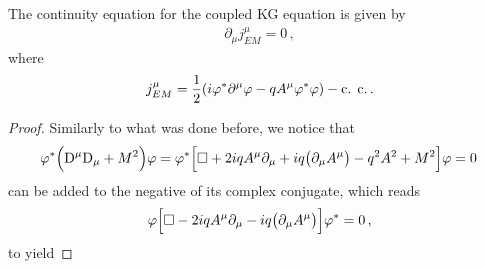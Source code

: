 \documentclass[main.tex]{subfiles}
\begin{document}
\begin{claim}
The continuity equation for the coupled KG equation is given by 
%
\begin{align}
\partial_{\mu } j^{\mu }_{EM} = 0
\,,
\end{align}
%
where 
%
\begin{align}
j^{\mu }_{EM} = \frac{1}{2} \qty(i \varphi^{*} \partial^{\mu } \varphi   - q A^{\mu } \varphi^{*} \varphi ) - \text{c. c.}
\,.
\end{align}
\end{claim}

\begin{proof}
Similarly to what was done before, we notice that 
%
\begin{align}
\varphi^{*} \qty(\mathrm{D}^{\mu } \mathrm{D}_{\mu } + M^2) \varphi = 
\varphi^{*}\qty[\square + 2iq A^{\mu } \partial_{\mu } + iq \qty(\partial_{\mu } A^{\mu }) - q^2A^2 + M^2] \varphi
=0
\,
\end{align}
%
can be added to the negative of its complex conjugate, which reads 
%
\begin{align}
\varphi \qty[\square - 2 iq A^{\mu }\partial_{\mu } - i q \qty(\partial_{\mu } A^{\mu }) ] \varphi^{*} = 0
\,,
\end{align}
%
to yield 

\end{proof}
\end{document}
